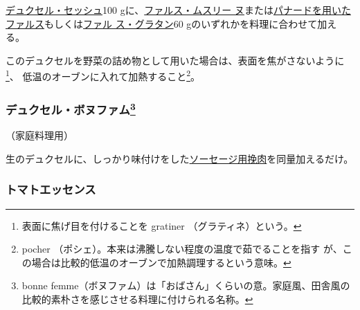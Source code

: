 \begin{recette}
\protect\hyperlink{duxelles-seche}{デュクセル・セッシュ}100
gに、\protect\hyperlink{farce-c}{ファルス・ムスリー
ヌ}または\protect\hyperlink{farce-a}{パナードを用いたファルス}もしくは\protect\hyperlink{farce-gratin-a}{ファル
ス・グラタン}60 gのいずれかを料理に合わせて加える。

このデュクセルを野菜の詰め物として用いた場合は、表面を焦がさないように\footnote{表面に焦げ目を付けることを
  gratiner （グラティネ）という。}、
低温のオーブンに入れて加熱すること\footnote{pocher
  （ポシェ）。本来は沸騰しない程度の温度で茹でることを指す
  が、この場合は比較的低温のオーブンで加熱調理するという意味。}。

\maeaki

\hypertarget{duxelles-bonne-femme}{%
\subsubsection[デュクセル・ボヌファム]{\texorpdfstring{デュクセル・ボヌファム\footnote{bonne
  femme（ボヌファム）は「おばさん」くらいの意。家庭風、田舎風の比較的素朴さを感じさせる料理に付けられる名称。}}{デュクセル・ボヌファム}}\label{duxelles-bonne-femme}}



（家庭料理用）

生のデュクセルに、しっかり味付けをした\protect\hyperlink{chair-a-saucisse}{ソーセージ用挽肉}を同量加えるだけ。

\maeaki

\hypertarget{essence-de-tomate}{%
\subsubsection{トマトエッセンス}\label{essence-de-tomate}}



\end{recette}

